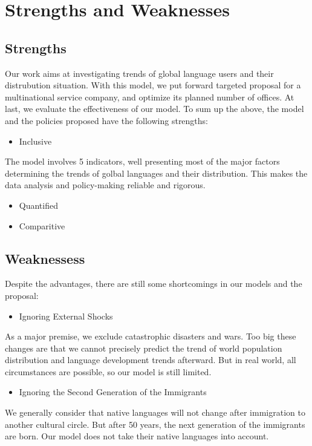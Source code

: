 \MinParskip{}

\section{Strengths and Weaknesses}
\subsection{Strengths}

Our work aims at investigating trends of global language users and their distrubution situation. With this model, we put forward targeted proposal for a multinational service company, and optimize its planned number of offices. At last, we evaluate the effectiveness of our model. To sum up the above, the model and the policies proposed have the following strengths:

\begin{itemize}
    \item Inclusive
\end{itemize}

The model involves 5 indicators, well presenting most of the major factors determining the trends of golbal languages and their distribution. This makes the data analysis and policy-making reliable and rigorous.

\begin{itemize}
    \item Quantified
\end{itemize}


\begin{itemize}
    \item Comparitive
\end{itemize}


\subsection{Weaknessess}

Despite the advantages, there are still some shortcomings in our models and the proposal:

\begin{itemize}
    \item Ignoring External Shocks
\end{itemize}

As a major premise, we exclude catastrophic disasters and wars. Too big these changes are that we cannot precisely predict the trend of world population distribution and language development trends afterward. But in real world, all circumstances are possible, so our model is still limited.

\begin{itemize}
    \item Ignoring the Second Generation of the Immigrants
\end{itemize}

We generally consider that native languages will not change after immigration to another cultural circle. But after 50 years, the next generation of the immigrants are born. Our model does not take their native languages into account.

